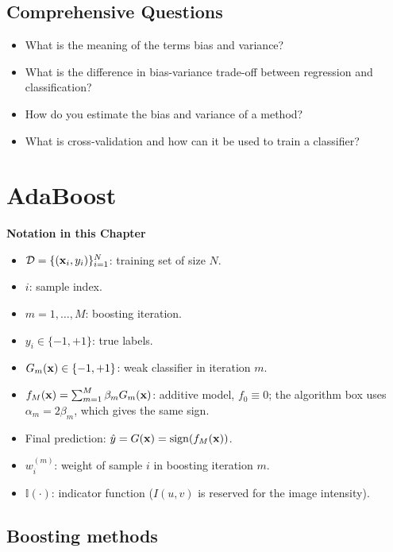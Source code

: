 \subsection{Comprehensive Questions}
 
  \begin{itemize}
    \item What is the meaning of the terms bias and variance?         
    \item What is the difference in bias-variance trade-off between regression and classification?         
    \item How do you estimate the bias and variance of a method?         
    \item What is cross-validation and how can it be used to train a classifier?
  \end{itemize}
          

\def\err{{\mathop{\overline{\mathsf{err}}}}}

\section{AdaBoost}\autocite{hastie2009,freund1997,matas,viola2001,viola2004}

\textbf{Notation in this Chapter}\\
{\small
\begin{itemize}
  \item $\mathcal D=\{(\bm{\mathrm{x}}_i,y_i)\}_{i=1}^N$: training set of size $N$.
  \item $i$: sample index.
  \item $m=1,\dots,M$: boosting iteration.
  \item $y_i\in\{-1,+1\}$: true labels.
  \item $G_m(\bm{\mathrm{x}})\in\{-1,+1\}$: weak classifier in iteration $m$.
  \item $f_M(\bm{\mathrm{x}})=\sum_{m=1}^M \beta_m G_m(\bm{\mathrm{x}})$: additive model, $f_0\equiv0$; the algorithm box uses $\alpha_m=2\beta_m$, which gives the same sign.
  \item Final prediction: $\hat y = G(\bm{\mathrm{x}})=\operatorname{sign}(f_M(\bm{\mathrm{x}}))$.
  \item $w_i^{(m)}$: weight of sample $i$ in boosting iteration $m$.
  \item $\mathbb I(\cdot)$: indicator function ($I(u,v)$ is reserved for the image intensity).
\end{itemize}
}

\subsection{Boosting methods}


